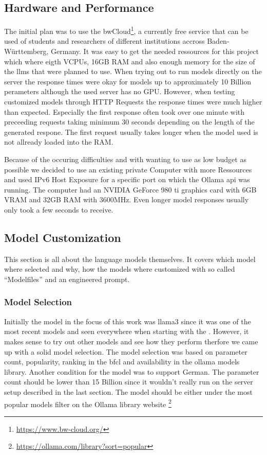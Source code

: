 \subsection{Hardware and Performance}
\label{subsec:hardware}
The initial plan was to use the bwCloud\footnote{\url{https://www.bw-cloud.org/}}, a currently free service that can be used of students and researchers of different institutions accross Baden-Württemberg, Germany.
It was easy to get the needed ressources for this project which where eigth VCPUs, 16GB RAM and also enough memory for the size of the \glspl{llm} that were planned to use.
When trying out to run models directly on the server the response times were okay for models up to approximately 10 Billion perameters although the used server has no GPU.
However, when testing customized models through HTTP Requests the response times were much higher than expected.
Especially the first response often took over one minute with preceeding requests taking minimum 30 seconds depending on the length of the generated respone.
The first request usually takes longer when the model used is not allready loaded into the RAM.

Because of the occuring difficulties and with wanting to use as low budget as possible we decided to use an existing private Computer with more Ressources and used IPv6 Host Exposure for a specific port on which the Ollama \gls{api} was running.
The computer had an NVIDIA GeForce 980 ti graphics card with 6GB VRAM and 32GB RAM with 3600MHz.
Even longer model responses usually only took a few seconds to receive.

\subsection{Model Customization}
\label{subsec:modelcust}
This section is all about the language models themselves. It covers which model where selected and why, how the models where customized with so called ``Modelfiles'' and an engineered prompt.
\subsubsection{Model Selection}
Initially the model in the focus of this work was llama3 since it was one of the most recent models and seen everywhere when starting with the .
However, it makes sense to try out other models and see how they perform therfore we came up with a solid model selection.
The model selection was based on parameter count, popularity, ranking in the \gls{bfcl} and availability in the ollama models library.
Another condition for the model was to support German.
The parameter count should be lower than 15 Billion since it wouldn't really run on the server setup described in the last section.
The model should be either under the most popular models filter on the Ollama library website \footnote{\url{https://ollama.com/library?sort=popular}}

